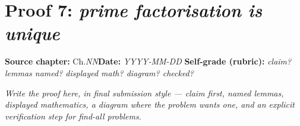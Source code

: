 \documentclass[11pt]{article}
\begin{document}
\section*{Proof 7: \emph{prime factorisation is unique}}
\textbf{Source chapter:} Ch.\emph{NN}\quad \textbf{Date:} \emph{YYYY-MM-DD}\quad
\textbf{Self-grade (rubric):} \emph{claim? lemmas named? displayed math? diagram? checked?}
\medskip

\emph{Write the proof here, in final submission style — claim first, named lemmas,
displayed mathematics, a diagram where the problem wants one, and an explicit
verification step for find-all problems.}
\end{document}
